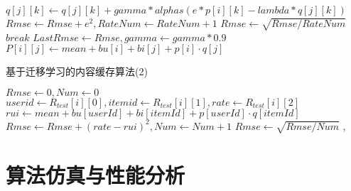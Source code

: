 \documentclass[bachelor]{seuthesis} %
\begin{document}
\begin{Main}
\begin{algorithm}
\begin{algorithmic}[1]
                        \State $q[j][k]\gets q[j][k]+gamma*alphas(e*p[i][k]-lambda*q[j][k])$
                    \EndFor
                    \State $Rmse\gets Rmse+e^2,RateNum\gets RateNum+1$
                \EndFor
            \EndFor
            \State $Rmse\gets\sqrt{Rmse/RateNum}$
                \State $break$
            \EndIf
            \State $LastRmse\gets Rmse,gamma\gets gamma*0.9$
        \EndFor
                    \State $P[i][j]\gets mean+bu[i]+bi[j]+p[i]\cdot q[j]$
                \EndFor
        \EndFor
        \State {}
        \EndFunction
    \end{algorithmic}
\end{algorithm}
\newpage
\begin{algorithm}
    \caption{基于迁移学习的内容缓存算法(2)}
    \begin{algorithmic}[1] %
        \State $Rmse\gets0,Num\gets0$
            \State $userid\gets R_{test}[i][0],itemid\gets R_{test}[i][1],rate\gets R_{test}[i][2]$
            \State $rui\gets mean+bu[userId]+bi[itemId]+p[userId]\cdot q[itemId]$
            \State $Rmse\gets Rmse+(rate-rui)^2,Num\gets Num+1$
        \EndFor
        \State $Rmse\gets\sqrt{Rmse/Num}$
        \State {}
        \EndFunction
        \State {}
        \State {},
        \EndFunction
    \end{algorithmic}
\end{algorithm}
\section{算法仿真与性能分析}

\end{Main}
\end{document}
